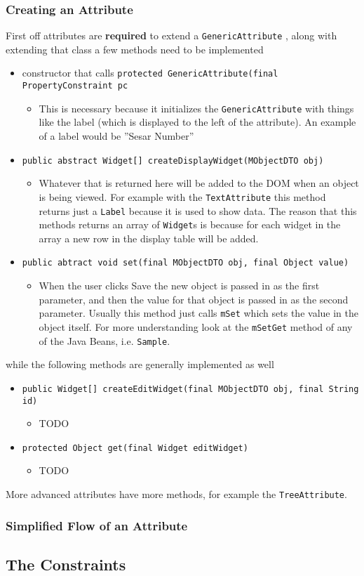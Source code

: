 \documentclass[10pt,letterpaper,onecolumn,oneside]{report}
\begin{document}
\subsubsection{Creating an Attribute}
First off attributes are \textbf{required} to extend a \texttt{GenericAttribute}
, along with extending that class a few methods need to be implemented
\begin{itemize}
\item constructor that calls \texttt{protected GenericAttribute(final PropertyConstraint pc}
\begin{itemize}
\item This is necessary because it initializes the \texttt{GenericAttribute}
with things like the label (which is displayed to the left of the attribute).  An example of a label would be ''Sesar Number''
\end{itemize}
\item \texttt{public abstract Widget[] createDisplayWidget(MObjectDTO obj)}
\begin{itemize}
\item Whatever that is returned here will be added to the DOM when an object
is being viewed.  For example with the \texttt{TextAttribute} this method
returns just a \texttt{Label} because it is used to show data.  The reason
that this methods returns an array of \texttt{Widget}s is because for each
widget in the array a new row in the display table will be added.
\end{itemize}
\item \texttt{public abtract void set(final MObjectDTO obj, final Object value)}
\begin{itemize}
\item When the user clicks Save the new object is passed in as the first
parameter, and then the value for that object is passed in as the second
parameter.  Usually this method just calls \texttt{mSet} which sets the value
in the object itself.  For more understanding look at the \texttt{mSetGet}
method of any of the Java Beans, i.e. \texttt{Sample}.
\end{itemize}
\end{itemize}
while the following methods are generally implemented as well
\begin{itemize}
\item \texttt{public Widget[] createEditWidget(final MObjectDTO obj, final String id)}
\begin{itemize}
\item TODO
\end{itemize}
\item \texttt{protected Object get(final Widget editWidget)}
\begin{itemize}
\item TODO
\end{itemize}
\end{itemize}
More advanced attributes have more methods, for example the \texttt{TreeAttribute}.

\subsubsection{Simplified Flow of an Attribute}
\subsection{The Constraints}
\end{document}

